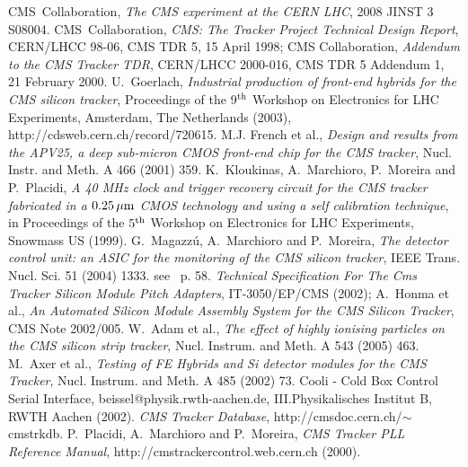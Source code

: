 \begin{thebibliography}{9}
 CMS~Collaboration, {\em The CMS experiment at
    the CERN LHC}, 2008 JINST 3 S08004.
 CMS~Collaboration, {\em CMS: The Tracker Project
    Technical Design Report}, CERN/LHCC 98-06, CMS TDR 5, 15 April
  1998; CMS Collaboration, {\em Addendum to the CMS Tracker TDR}, CERN/LHCC
  2000-016, CMS TDR 5 Addendum 1, 21 February 2000.
 U.~Goerlach, {\em Industrial production of front-end
    hybrids for the CMS silicon tracker}, Proceedings of the 9$^{\rm
    th}$ Workshop on Electronics for LHC Experiments, Amsterdam, The
  Netherlands (2003), http://cdsweb.cern.ch/record/720615.
 M.J. French et al., {\em Design and results from the
    APV25, a deep sub-micron CMOS front-end chip for the CMS tracker},
  Nucl. Instr. and Meth. A 466 (2001) 359.
 K.~Kloukinas, A.~Marchioro, P.~Moreira and P.~Placidi,
  {\em A 40 MHz clock and trigger recovery circuit for the CMS tracker
    fabricated in a $0.25{\, \mu \rm m}$ CMOS technology and using a self
    calibration technique}, in Proceedings of the $5^{\rm th}$
  Workshop on Electronics for LHC Experiments, Snowmass US (1999).
 G.~Magazz\'u, A.~Marchioro and P.~Moreira, {\em The
    detector control unit: an ASIC for the monitoring of the CMS
    silicon tracker}, IEEE Trans. Nucl. Sci. 51 (2004) 1333.
 see~\cite{bigcmspaper} p. 58. 
 {\em Technical Specification For The Cms Tracker Silicon
  Module Pitch Adapters}, IT-3050/EP/CMS (2002);
 A.~Honma et al., {\em An Automated Silicon Module
    Assembly System for the CMS Silicon Tracker}, CMS Note 2002/005.
 W.~Adam et al., {\em The effect of highly ionising
    particles on the CMS silicon strip tracker}, Nucl. Instrum. and
  Meth. A 543 (2005) 463.
 M.~Axer et al., {\em Testing of FE Hybrids and Si
    detector modules for the CMS Tracker}, Nucl. Instrum. and Meth. A
  485 (2002) 73.
 Cooli - Cold Box Control Serial Interface,
  beissel@physik.rwth-aachen.de, III.Physikalisches Institut B, RWTH
  Aachen (2002).
  {\em CMS Tracker Database}, http://cmsdoc.cern.ch/$\sim$cmstrkdb.
 P.~Placidi, A.~Marchioro and P.~Moreira, {\em CMS
    Tracker PLL Reference Manual},
  http://cmstrackercontrol.web.cern.ch (2000).
\end{thebibliography}
